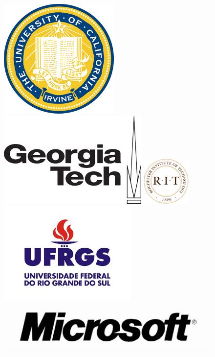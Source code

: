\documentclass[10pt]{beamer}
\begin{document}
\begin{frame}
\begin{columns}[t]
\begin{figure}[h]
			\centering
			  \includegraphics[scale=0.2]{figures/UCI_Logo.jpg} 
	          \label{fig:UCILogo}       
	          \includegraphics[scale=0.2]{figures/GaTech_Logo.jpg} 	
	          \label{fig:GaTechLogo}
	          \includegraphics[scale=0.3]{figures/RIT_Logo.jpg} 	
	          \label{fig:RITLogo}
			  \includegraphics[scale=0.2]{figures/UFR_Logo.jpg} 
	          \label{fig:UFRLogo}             
	          \includegraphics[scale=0.2]{figures/Microsoft_Logo.jpg} 	

\end{figure}
\end{columns}
\end{frame}
\end{document}
